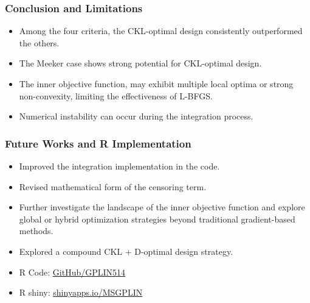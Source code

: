 \documentclass[xcolor=dvipsnames,aspectratio=1610]{beamer}
\begin{document}
\begin{frame}
\frametitle{Conclusion and Limitations}

\begin{itemize}
\item Among the four criteria, the CKL-optimal design consistently outperformed the others.

\item The Meeker case shows strong potential for CKL-optimal design.

\item The inner objective function, may exhibit multiple local optima or strong non-convexity, limiting the effectiveness of L-BFGS.

\item Numerical instability can occur during the integration process.
\end{itemize}
\end{frame}


\begin{frame}
\frametitle{Future Works and R Implementation}

\begin{itemize}
\item Improved the integration implementation in the code.

\item Revised mathematical form of the censoring term.

\item Further investigate the landscape of the inner objective function and explore global or hybrid optimization strategies beyond traditional gradient-based methods.

\item Explored a compound CKL + D-optimal design strategy.
\end{itemize}
\vspace{0.5cm}
\begin{itemize}
\item R Code: \href{https://github.com/GPLIN514/Master-Thesis-ALT-Model-Discrimination-Design/blob/main/Thesis-code/code/Appendix\%20B\%20example\%20code.R}{GitHub/GPLIN514}

\item R shiny: \href{https://msgplin.shinyapps.io/Model-Discrimination-Design/}{shinyapps.io/MSGPLIN}

\end{itemize}

\end{frame}
\end{document}
